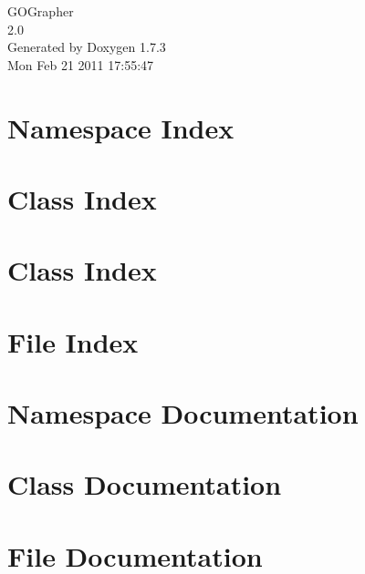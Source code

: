 \documentclass[a4paper]{book}
\begin{document}
\hypersetup{pageanchor=false}
\begin{titlepage}
\vspace*{7cm}
\begin{center}
{\Large GOGrapher \\[1ex]\large 2.0 }\\
\vspace*{1cm}
{\large Generated by Doxygen 1.7.3}\\
\vspace*{0.5cm}
{\small Mon Feb 21 2011 17:55:47}\\
\end{center}
\end{titlepage}
\clearemptydoublepage
{}
\tableofcontents
\clearemptydoublepage
{}
\hypersetup{pageanchor=true}
\chapter{Namespace Index}

\chapter{Class Index}

\chapter{Class Index}

\chapter{File Index}

\chapter{Namespace Documentation}







\chapter{Class Documentation}






\chapter{File Documentation}







\printindex
\end{document}
